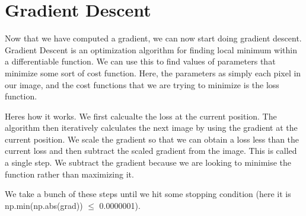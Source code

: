 \documentclass[letterpaper,10pt,english]{jupyterBook}
\begin{document}
\section{Gradient Descent}
\label{\detokenize{finite_gradient:gradient-descent}}
\sphinxAtStartPar
Now that we have computed a gradient, we can now start doing gradient descent. Gradient Descent is an optimization algorithm for finding local minimum within a differentiable function. We can use this to find values of parameters that minimize some sort of cost function. Here, the parameters as simply each pixel in our image, and the cost functions that we are trying to minimize is the loss function.

\sphinxAtStartPar
Heres how it works. We first calcualte the loss at the current position. The algorithm then iteratively calculates the next image by using the gradient at the current position. We scale the gradient so that we can obtain a loss less than the current loss and then subtract the scaled gradient from the image. This is called a single step. We subtract the gradient because we are looking to minimise the function rather than maximizing it.

\sphinxAtStartPar
We take a bunch of these steps until we hit some stopping condition (here it is np.min(np.abs(grad)) \(\leq\) 0.0000001).
\end{document}
